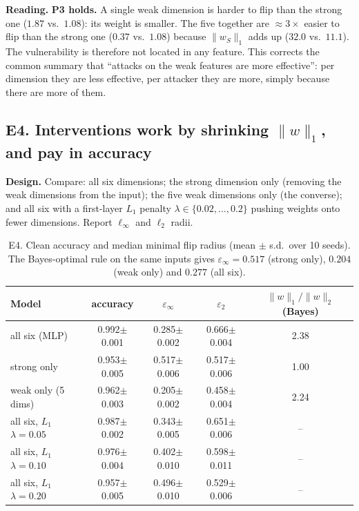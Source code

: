 \documentclass[11pt]{article}
\newcommand{\linf}{\ell_\infty}
\newcommand{\ltwo}{\ell_2}
\newcommand{\epsinf}{\varepsilon_\infty}
\newcommand{\epstwo}{\varepsilon_2}
\begin{document}
\textbf{Reading.} \textbf{P3 holds.} A single weak dimension is harder to flip
than the strong one ($1.87$ vs.\ $1.08$): its weight is smaller. The five
together are $\approx 3\times$ easier to flip than the strong one ($0.37$ vs.\
$1.08$) because $\|w_S\|_1$ adds up ($32.0$ vs.\ $11.1$). The vulnerability is
therefore not located in any feature. This corrects the common summary that
``attacks on the weak features are more effective'': per dimension they are
less effective, per attacker they are more, simply because there are more of
them.

\subsection{E4. Interventions work by shrinking $\|w\|_1$, and pay in accuracy}

\textbf{Design.} Compare: all six dimensions; the strong dimension only
(removing the weak dimensions from the input); the five weak dimensions only
(the converse); and all six with a first-layer
$L_1$ penalty $\lambda\in\{0.02,\dots,0.2\}$ pushing weights onto fewer
dimensions. Report $\linf$ and $\ltwo$ radii.

\begin{table}[h]
\centering
\caption{E4. Clean accuracy and median minimal flip radius (mean $\pm$ s.d.\ over
10 seeds). The Bayes-optimal rule on the same inputs gives $\epsinf=0.517$ (strong only),
$0.204$ (weak only) and $0.277$ (all six).}
\label{tab:interv}
\begin{tabular}{lcccc}
\toprule
Model & accuracy & $\epsinf$ & $\epstwo$ & $\|w\|_1/\|w\|_2$ (Bayes)\\
\midrule
all six (MLP)            & 0.992$\pm$0.001 & 0.285$\pm$0.002 & 0.666$\pm$0.004 & 2.38\\
strong only              & 0.953$\pm$0.005 & 0.517$\pm$0.006 & 0.517$\pm$0.006 & 1.00\\
weak only (5 dims)       & 0.962$\pm$0.003 & 0.205$\pm$0.002 & 0.458$\pm$0.004 & 2.24\\
all six, $L_1$ $\lambda=0.05$ & 0.987$\pm$0.002 & 0.343$\pm$0.005 & 0.651$\pm$0.006 & --\\
all six, $L_1$ $\lambda=0.10$ & 0.976$\pm$0.004 & 0.402$\pm$0.010 & 0.598$\pm$0.011 & --\\
all six, $L_1$ $\lambda=0.20$ & 0.957$\pm$0.005 & 0.496$\pm$0.010 & 0.529$\pm$0.006 & --\\
\bottomrule
\end{tabular}
\end{table}
\end{document}
